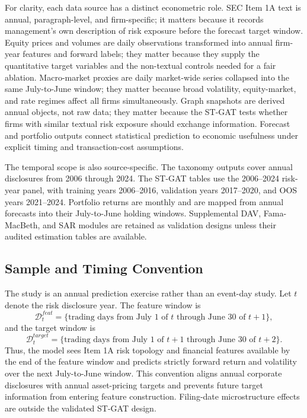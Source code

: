 \documentclass[11pt, a4paper]{article}
\begin{document}
For clarity, each data source has a distinct econometric role. SEC Item 1A text is annual, paragraph-level, and firm-specific; it matters because it records management's own description of risk exposure before the forecast target window. Equity prices and volumes are daily observations transformed into annual firm-year features and forward labels; they matter because they supply the quantitative target variables and the non-textual controls needed for a fair ablation. Macro-market proxies are daily market-wide series collapsed into the same July-to-June window; they matter because broad volatility, equity-market, and rate regimes affect all firms simultaneously. Graph snapshots are derived annual objects, not raw data; they matter because the ST-GAT tests whether firms with similar textual risk exposure should exchange information. Forecast and portfolio outputs connect statistical prediction to economic usefulness under explicit timing and transaction-cost assumptions.

The temporal scope is also source-specific. The taxonomy outputs cover annual disclosures from 2006 through 2024. The ST-GAT tables use the 2006--2024 risk-year panel, with training years 2006--2016, validation years 2017--2020, and OOS years 2021--2024. Portfolio returns are monthly and are mapped from annual forecasts into their July-to-June holding windows. Supplemental DAV, Fama-MacBeth, and SAR modules are retained as validation designs unless their audited estimation tables are available.

\subsection{Sample and Timing Convention}
The study is an annual prediction exercise rather than an event-day study. Let $t$ denote the risk disclosure year. The feature window is
\begin{equation}
\mathcal{D}^{feat}_{t}=\{\text{trading days from July 1 of }t\text{ through June 30 of }t+1\},
\end{equation}
and the target window is
\begin{equation}
\mathcal{D}^{target}_{t}=\{\text{trading days from July 1 of }t+1\text{ through June 30 of }t+2\}.
\end{equation}
Thus, the model sees Item 1A risk topology and financial features available by the end of the feature window and predicts strictly forward return and volatility over the next July-to-June window. This convention aligns annual corporate disclosures with annual asset-pricing targets and prevents future target information from entering feature construction. Filing-date microstructure effects are outside the validated ST-GAT design.
\end{document}
